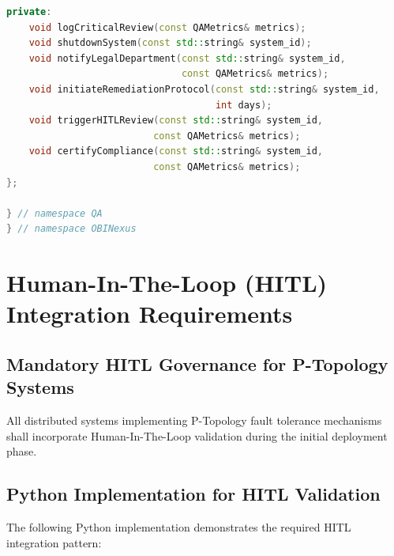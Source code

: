 \documentclass[12pt,a4paper]{article}
\begin{document}
\begin{lstlisting}[language=C++, caption=Mandatory QA Validation Framework]
private:
    void logCriticalReview(const QAMetrics& metrics);
    void shutdownSystem(const std::string& system_id);
    void notifyLegalDepartment(const std::string& system_id, 
                               const QAMetrics& metrics);
    void initiateRemediationProtocol(const std::string& system_id, 
                                     int days);
    void triggerHITLReview(const std::string& system_id, 
                          const QAMetrics& metrics);
    void certifyCompliance(const std::string& system_id, 
                          const QAMetrics& metrics);
};

} // namespace QA
} // namespace OBINexus
\end{lstlisting}

\section{Human-In-The-Loop (HITL) Integration Requirements}

\subsection{Mandatory HITL Governance for P-Topology Systems}

All distributed systems implementing P-Topology fault tolerance mechanisms shall incorporate Human-In-The-Loop validation during the initial deployment phase.

\subsection{Python Implementation for HITL Validation}

The following Python implementation demonstrates the required HITL integration pattern:
\end{document}
